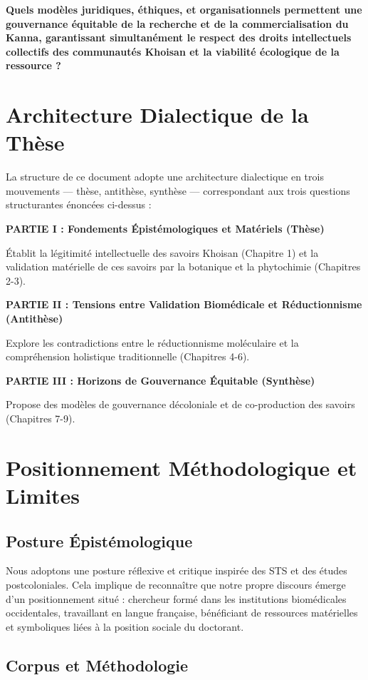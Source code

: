 \documentclass[12pt,a4paper]{report}
\begin{document}
\textbf{Quels modèles juridiques, éthiques, et organisationnels permettent une gouvernance équitable de la recherche et de la commercialisation du Kanna, garantissant simultanément le respect des droits intellectuels collectifs des communautés Khoisan et la viabilité écologique de la ressource ?}

\section{Architecture Dialectique de la Thèse}

La structure de ce document adopte une architecture dialectique en trois mouvements — thèse, antithèse, synthèse — correspondant aux trois questions structurantes énoncées ci-dessus :

\textbf{PARTIE I : Fondements Épistémologiques et Matériels (Thèse)}

Établit la légitimité intellectuelle des savoirs Khoisan (Chapitre 1) et la validation matérielle de ces savoirs par la botanique et la phytochimie (Chapitres 2-3).

\textbf{PARTIE II : Tensions entre Validation Biomédicale et Réductionnisme (Antithèse)}

Explore les contradictions entre le réductionnisme moléculaire et la compréhension holistique traditionnelle (Chapitres 4-6).

\textbf{PARTIE III : Horizons de Gouvernance Équitable (Synthèse)}

Propose des modèles de gouvernance décoloniale et de co-production des savoirs (Chapitres 7-9).

\section{Positionnement Méthodologique et Limites}

\subsection{Posture Épistémologique}

Nous adoptons une posture réflexive et critique inspirée des STS et des études postcoloniales. Cela implique de reconnaître que notre propre discours émerge d'un positionnement situé : chercheur formé dans les institutions biomédicales occidentales, travaillant en langue française, bénéficiant de ressources matérielles et symboliques liées à la position sociale du doctorant.

\subsection{Corpus et Méthodologie}
\end{document}
